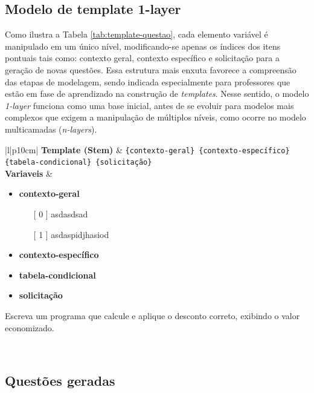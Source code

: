 \subsection{Modelo de template 1-layer}

Como ilustra a Tabela \ref{tab:template-questao}, cada elemento variável é manipulado em um único nível, modificando-se apenas os índices dos itens pontuais tais como: contexto geral, contexto específico e solicitação para a geração de novas questões. Essa estrutura mais enxuta favorece a compreensão das etapas de modelagem, sendo indicada especialmente para professores que estão em fase de aprendizado na construção de \textit{templates}. Nesse sentido, o modelo \textit{1-layer} funciona como uma base inicial, antes de se evoluir para modelos mais complexos que exigem a manipulação de múltiplos níveis, como ocorre no modelo multicamadas (\textit{n-layers}).
\begin{table}[htbp]
\centering
\begin{tabular}{|l|p{10cm}|}
\hline
\textbf{Template (Stem)} 
& \texttt{\{contexto-geral\} \{contexto-específico\} \{tabela-condicional\} \{solicitação\}} \\
\hline
\textbf{Variaveis} 
& 
\begin{minipage}[t]{\linewidth}
\vspace{0.5em}
\begin{itemize}[leftmargin=1em]
    \item {\textbf{contexto-geral}}
    \begin{itemize}
        \item [ [ 0]] asdasdsad
        \item [ [ 1]] asdaspidjhasiod
    \end{itemize}
    \item {\textbf{contexto-específico}}
    \item {\textbf{tabela-condicional}}
    \item {\textbf{solicitação}}
\end{itemize}
Escreva um programa que calcule e aplique o desconto correto, exibindo o valor economizado. 
\vspace{0.5em}
\end{minipage} \\
\hline
\end{tabular}
\caption{Template de questão - condicional simples (Autoria Própria, 2024)}
\label{tab:template-questao}
\end{table}

\subsection{Questões geradas}

